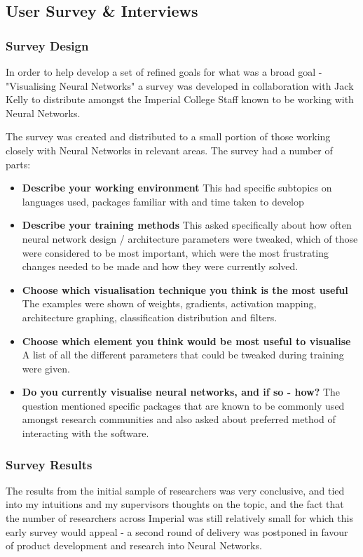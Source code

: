 \documentclass[a4paper,11pt,titlepage]{article}
\begin{document}
	\subsection{User Survey \& Interviews}
	\subsubsection{Survey Design}
	\par
	In order to help develop a set of refined goals for what was a broad goal - "Visualising Neural Networks"	 a survey was developed in collaboration with Jack Kelly to distribute amongst the Imperial College Staff known to be working with Neural Networks.
	\par 
	The survey was created and distributed to a small portion of those working closely with Neural Networks in relevant areas. The survey had a number of parts:
	\begin{itemize}
	
		\item \textbf{Describe your working environment}
		This had specific subtopics on languages used, packages familiar with and time taken to develop
		\item \textbf{Describe your training methods}
		This asked specifically about how often neural network design / architecture parameters were tweaked, which of those were considered to be most important, which were the most frustrating changes needed to be made and how they were currently solved.
		\item \textbf{Choose which visualisation technique you think is the most useful}
		The examples were shown of weights, gradients, activation mapping, architecture graphing, classification distribution and filters. 
		\item \textbf{Choose which element you think would be most useful to visualise}
		A list of all the different parameters that could be tweaked during training were given.
		\item \textbf{Do you currently visualise neural networks, and if so - how?}
		The question mentioned specific packages that are known to be commonly used amongst research communities and also asked about preferred method of interacting with the software. 
	
	\end{itemize}
	
	\subsubsection{Survey Results}
	\par 
	The results from the initial sample of researchers was very conclusive, and tied into my intuitions and my supervisors thoughts on the topic, and the fact that the number of researchers across Imperial was still relatively small for which this early survey would appeal - a second round of delivery was postponed in favour of product development and research into Neural Networks.
	\par
\end{document}

